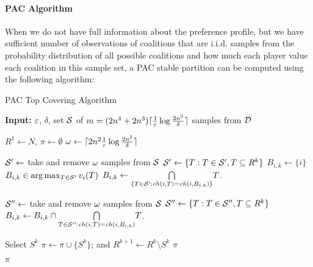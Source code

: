 \paragraph{PAC Algorithm}
\label{para:pac_algo}

When we do not have full information about the preference profile, but we have
sufficient number of observations of coalitions that are i.i.d. samples from
the probability distribution of all possible coalitions and how much each player
value each coalition in this sample set, a PAC stable partition can be computed
using the following algorithm:

\begin{algorithm}[htb]
  \caption{PAC Top Covering Algorithm}
  \label{alg:pac_top_covering}
  \textbf{Input:} $\eps$, $\delta$, set $\cal S$ of $m = (2n^4 + 2n^3)\ceil{\frac{1}{\eps}\log\frac{2n^3}{\delta}}$ samples from $\cal D$
  \begin{algorithmic}[1]

  \State $R^1 \gets N$, $\pi \gets \emptyset$
  \State $\samples \gets \ceil{2n^2 \frac{1}{\eps}\log\frac{2n^3}{\delta}}$

    \State \label{pac_top_cover:sample_begin} $\cal S' \gets$ take and remove $\samples$ samples from $\cal S$
    \State $\cal S' \gets \{T: T \in \cal S', T \subseteq R^k\}$
        \State$B_{i,k} \gets \{i\}$
      \Else
        \State \label{pac_top_cover:argmax} $B_{i,k} \in \arg\max_{T \in \cal S'}{v_i(T)}$
        \State $B_{i,k} \gets \underset{\{T \in \cal S' : \ch(i,T) = \ch(i,B_{i,k})\}}{\bigcap} T$.
      \EndIf
    \EndFor

      \State $\cal S'' \gets$ take and remove $\samples$ samples from $\cal S$
      \State $\cal S'' \gets \{T: T \in \cal S'', T \subseteq R^k\}$
        \State $B_{i,k} \gets B_{i,k} \cap \underset{T \in \cal S'' : \ch(i,T) = \ch(i,B_{i,k})}{\bigcap} T$.
      \EndFor
    \EndFor \label{pac_top_cover:sample_end}

    \State \label{pac_top_cover:select} Select $S^k$
    \State $\pi \leftarrow  \pi \cup \lbrace S^k \rbrace$; and $R^{k+1} \leftarrow  R^k \setminus S^k$
      \State \Return $\pi$
    \EndIf
  \EndFor

  \State \Return $\pi$
 \end{algorithmic}
\end{algorithm}

